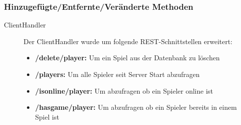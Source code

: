 \documentclass[parskip=full]{scrartcl}
\begin{document}
		\subsubsection{Hinzugefügte/Entfernte/Veränderte Methoden}
		\begin{description}
			\item[ClientHandler] Der ClientHandler wurde um folgende REST-Schnittstellen erweitert:
			\begin{itemize}
				\item \textbf{/delete/player:} Um ein Spiel aus der Datenbank zu löschen
				\item \textbf{/players:} Um alle Spieler seit Server Start abzufragen
				\item \textbf{/isonline/player:} Um abzufragen ob ein Spieler online ist
				\item \textbf{/hasgame/player:} Um abzufragen ob ein Spieler bereits in einem Spiel ist
			\end{itemize}
		\end{description}
		
\end{document}

